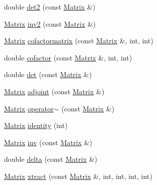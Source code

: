 \begin{DoxyCompactItemize}
\item 
double \hyperlink{classchittmatrix_1_1Matrix_a8cc2f45639ddfa05bf093f2e28a2c7e6}{det2} (const \hyperlink{classchittmatrix_1_1Matrix}{\-Matrix} \&)
\item 
\hyperlink{classchittmatrix_1_1Matrix}{\-Matrix} \hyperlink{classchittmatrix_1_1Matrix_a7ac509f20af3840cbe434e7c4b207ddb}{inv2} (const \hyperlink{classchittmatrix_1_1Matrix}{\-Matrix} \&)
\item 
\hyperlink{classchittmatrix_1_1Matrix}{\-Matrix} \hyperlink{classchittmatrix_1_1Matrix_a61ad95a5122220b502feb2cb980f76b0}{cofactormatrix} (const \hyperlink{classchittmatrix_1_1Matrix}{\-Matrix} \&, int, int)
\item 
double \hyperlink{classchittmatrix_1_1Matrix_aca4074e1f1b7d1bee131f6ecee6c0f16}{cofactor} (const \hyperlink{classchittmatrix_1_1Matrix}{\-Matrix} \&, int, int)
\item 
double \hyperlink{classchittmatrix_1_1Matrix_a148f7362c35edea1dd649b9f25606a59}{det} (const \hyperlink{classchittmatrix_1_1Matrix}{\-Matrix} \&)
\item 
\hyperlink{classchittmatrix_1_1Matrix}{\-Matrix} \hyperlink{classchittmatrix_1_1Matrix_a7681a9d77c0781348d1c67a6c11705c5}{adjoint} (const \hyperlink{classchittmatrix_1_1Matrix}{\-Matrix} \&)
\item 
\hyperlink{classchittmatrix_1_1Matrix}{\-Matrix} \hyperlink{classchittmatrix_1_1Matrix_a803aafaddd1db4b9dd38ff26b8fb2b02}{operator$\sim$} (const \hyperlink{classchittmatrix_1_1Matrix}{\-Matrix} \&)
\item 
\hyperlink{classchittmatrix_1_1Matrix}{\-Matrix} \hyperlink{classchittmatrix_1_1Matrix_ad55b63026a70ff8140efaa2a842f7ef4}{identity} (int)
\item 
\hyperlink{classchittmatrix_1_1Matrix}{\-Matrix} \hyperlink{classchittmatrix_1_1Matrix_ad4b6b9be82b67da97999048dbcc6b028}{inv} (const \hyperlink{classchittmatrix_1_1Matrix}{\-Matrix} \&)
\item 
double \hyperlink{classchittmatrix_1_1Matrix_ae21a3e8414cc907f1c5781db0f05966a}{delta} (const \hyperlink{classchittmatrix_1_1Matrix}{\-Matrix} \&)
\item 
\hyperlink{classchittmatrix_1_1Matrix}{\-Matrix} \hyperlink{classchittmatrix_1_1Matrix_a2ba03e86fdf045dd536eb860998feaf7}{xtract} (const \hyperlink{classchittmatrix_1_1Matrix}{\-Matrix} \&, int, int, int, int)
\end{DoxyCompactItemize}


